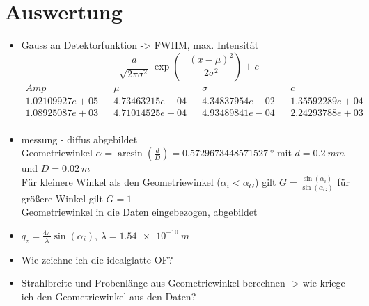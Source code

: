 \section{Auswertung}
\begin{itemize}
	\item Gauss an Detektorfunktion -> FWHM, max. Intensität
	\begin{equation*}
		\frac{a}{\sqrt{2 \pi \sigma^2}} \, \exp{\left(-\frac{\left(x-\mu \right)^2}{2 \sigma^2}\right)}+c
	\end{equation*}
	\begin{align}
		Amp && \mu && \sigma && c \\
		1.02109927e+05 && 4.73463215e-04 && 4.34837954e-02 && 1.35592289e+04 \\
		1.08925087e+03 && 4.71014525e-04 && 4.93489841e-04 && 2.24293788e+03 \\
	\end{align}
	\item messung - diffus abgebildet\\
	Geometriewinkel $\alpha = \arcsin{\left( \frac{d}{D}\right)} = \SI{0.5729673448571527}{°}$ mit $d=\SI{0.2}{mm}$ und $D=\SI{0.02}{m}$\\
	Für kleinere Winkel als den Geometriewinkel ($\alpha_i < \alpha_G$) gilt $G = \frac{\sin{(\alpha_i)}}{\sin{(\alpha_G)}}$ für größere Winkel gilt $G=1$\\
	Geometriewinkel in die Daten eingebezogen, abgebildet
	\item $q_z=\frac{4\pi}{\lambda}\sin{(\alpha_i)}$, $\lambda = \SI{1.54e-10}{m}$
	\item Wie zeichne ich die idealglatte OF?
	\item Strahlbreite und Probenlänge aus Geometriewinkel berechnen -> wie kriege ich den Geometriewinkel aus den Daten?
\end{itemize}
